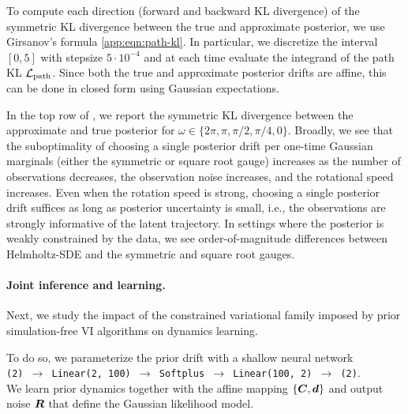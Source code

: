 To compute each direction (forward and backward KL divergence) of the symmetric KL divergence between the true and approximate posterior, we use Girsanov's formula \cref{app:eqn:path-kl}. 
In particular, we discretize the interval $[0, 5]$ with stepsize $5 \cdot 10^{-4}$ and at each time evaluate the integrand of the path KL $\mathcal{L}_{\mathrm{path}}$. 
Since both the true and approximate posterior drifts are affine, this can be done in closed form using Gaussian expectations.

In the top row of , we report the symmetric KL divergence between the approximate and true posterior for $\omega \in \{ 2\pi, \pi, \pi/2, \pi/4, 0\}$. 
Broadly, we see that the suboptimality of choosing a single posterior drift per one-time Gaussian marginals (either the symmetric or square root gauge) increases as the number of observations decreases, the observation noise increases, and the rotational speed increases. 
Even when the rotation speed is strong, choosing a single posterior drift suffices as long as posterior uncertainty is small, i.e., the observations are strongly informative of the latent trajectory.
In settings where the posterior is weakly constrained by the data, we see order-of-magnitude differences between Helmholtz-SDE and the symmetric and square root gauges.

\paragraph{Joint inference and learning.}
Next, we study the impact of the constrained variational family imposed by prior simulation-free VI algorithms on dynamics learning. 

To do so, we parameterize the prior drift with a shallow neural network\\
\texttt{(2) $\to$ Linear(2, 100) $\to$ Softplus $\to$ Linear(100, 2) $\to$ (2)}.\\
We learn prior dynamics together with the affine mapping $\{\boldsymbol{C}, \boldsymbol{d}\}$ and output noise $\boldsymbol{R}$ that define the Gaussian likelihood model.

